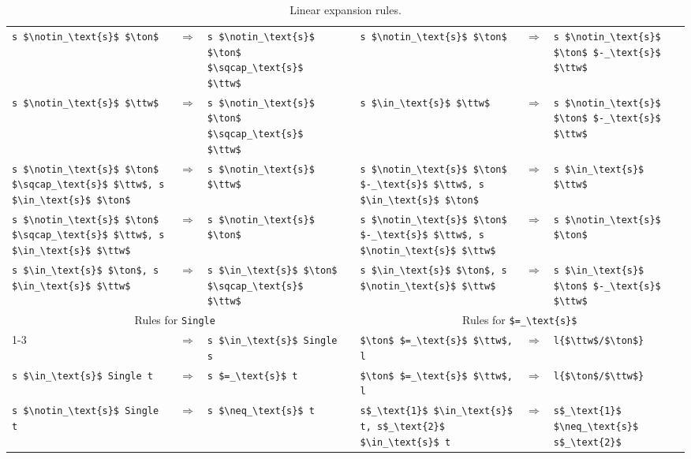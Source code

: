 \documentclass[sigplan,10pt,anonymous,review]{acmart}
\newcommand{\interS}{\sqcap_\text{s}}
\newcommand{\diffS}{-_\text{s}}
\newcommand{\inS}{\in_\text{s}}
\newcommand{\notinS}{\notin_\text{s}}
\newcommand{\eqS}{=_\text{s}}
\newcommand{\neqS}{\neq_\text{s}}
\begin{document}
\begin{table*}
\begin{tabular}{p{}cp{} p{} p{}cp{}}
    \lstinline!s $\notinS$ $\ton$! & $\Longrightarrow$ & \lstinline!s $\notinS$ $\ton$ $\interS$ $\ttw$! && 
    \lstinline!s $\notinS$ $\ton$! & $\Longrightarrow$ & \lstinline!s $\notinS$ $\ton$ $\diffS$ $\ttw$! \\

    \lstinline!s $\notinS$ $\ttw$! & $\Longrightarrow$ & \lstinline!s $\notinS$ $\ton$ $\interS$ $\ttw$! &&
    \lstinline!s $\inS$ $\ttw$! & $\Longrightarrow$ & \lstinline!s $\notinS$ $\ton$ $\diffS$ $\ttw$! \\

    \lstinline!s $\notinS$ $\ton$ $\interS$ $\ttw$, s $\inS$ $\ton$! & $\Longrightarrow$ & \lstinline!s $\notinS$ $\ttw$! && 
    \lstinline!s $\notinS$ $\ton$ $\diffS$ $\ttw$, s $\inS$ $\ton$! & $\Longrightarrow$ & \lstinline!s $\inS$ $\ttw$! \\

    \lstinline!s $\notinS$ $\ton$ $\interS$ $\ttw$, s $\inS$ $\ttw$! & $\Longrightarrow$ & \lstinline!s $\notinS$ $\ton$! && 
    \lstinline!s $\notinS$ $\ton$ $\diffS$ $\ttw$, s $\notinS$ $\ttw$! & $\Longrightarrow$ & \lstinline!s $\notinS$ $\ton$! \\

    \lstinline!s $\inS$ $\ton$, s $\inS$ $\ttw$! & $\Longrightarrow$ & \lstinline!s $\inS$ $\ton$ $\interS$ $\ttw$! &&
    \lstinline!s $\inS$ $\ton$, s $\notinS$ $\ttw$! & $\Longrightarrow$ & \lstinline!s $\inS$ $\ton$ $\diffS$ $\ttw$! \\[3ex]

    \multicolumn{3}{c}{Rules for \lstinline!Single!} && \multicolumn{3}{c}{Rules for \lstinline!$\eqS$!} \\
    \cmidrule{1-3}\cmidrule{5-7}
    & $\Longrightarrow$ & \lstinline!s $\inS$ Single s! &&
    \lstinline!$\ton$ $\eqS$ $\ttw$, l! & $\Longrightarrow$ & \lstinline!l{$\ttw$/$\ton$}! \\

    \lstinline!s $\inS$ Single t! & $\Longrightarrow$ & \lstinline!s $\eqS$ t! &&
    \lstinline!$\ton$ $\eqS$ $\ttw$, l! & $\Longrightarrow$ & \lstinline!l{$\ton$/$\ttw$}! \\

    \lstinline!s $\notinS$ Single t! & $\Longrightarrow$ & \lstinline!s $\neqS$ t! &&
    \lstinline!s$_\text{1}$ $\inS$ t, s$_\text{2}$ $\inS$ t! & $\Longrightarrow$ & \lstinline!s$_\text{1}$ $\neqS$ s$_\text{2}$! \\
    \bottomrule
  \end{tabular}
  \bigskip
  \caption{Linear expansion rules.\label{tab:lexpands}}
\end{table*}
\end{document}
